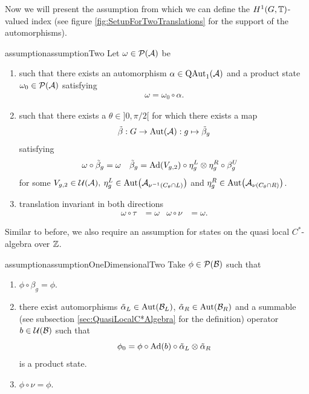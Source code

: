 \documentclass[12pt,a4paper,twoside]{article}
\numberwithin{equation}{section}
\begin{document}

Now we will present the assumption from which we can define the $H^1(G,\mathbb T)$-valued index (see figure \ref{fig:SetupForTwoTranslations} for the support of the automorphisms).
\begin{restatable}{assumption}{assumptionTwo}\label{assumption:2Translations}
	Let $\omega\in\mathcal P(\mathcal A)$ be
	\begin{enumerate}
		\item such that there exists an automorphism $\alpha\in\QAut{\AA}$ and a product state $\omega_0\in\mathcal P(\mathcal A)$ satisfying
		\begin{align}
			\omega=\omega_0\circ\alpha.
		\end{align}
		\item such that there exists a $\theta\in]0,\pi/2[$ for which there exists a map
		\begin{equation}
			\tilde\beta:G\rightarrow\Aut{\AA}:g\mapsto\tilde\beta_g
		\end{equation}
		satisfying
		\begin{align}
			\label{eq:2TranslationsCondition3part1}
			\omega\circ\tilde\beta_g&=\omega&\tilde\beta_g&=\Ad{V_{g,2}}\circ\eta^L_g\otimes\eta^R_g\circ\beta^U_g
		\end{align}
		for some $V_{g,2}\in\mathcal U(\mathcal A),$ $\eta^L_g\in\Aut{\AA_{\nu^{-1}(C_\theta\cap L)}}$ and  $\eta^R_g\in\Aut{\AA_{\nu(C_\theta\cap R)}}$.
		\item translation invariant in both directions
		\begin{align}
			\omega\circ\tau&=\omega&\omega\circ\nu&=\omega.
		\end{align}
	\end{enumerate}
\end{restatable}
Similar to before, we also require an assumption for states on the quasi local $C^*$-algebra over $\mathbb Z$.
\begin{restatable}{assumption}{assumptionOneDimensionalTwo}\label{assumption1dWithTranslation}
	Take $\phi\in\mathcal P(\mathcal B)$ such that
	\begin{enumerate}
		\item $\phi\circ\beta_g=\phi$.
		\item there exist automorphisms $\tilde\alpha_L\in\Aut{\BB_L}$, $\tilde\alpha_R\in\Aut{\BB_R}$ and a summable (see subsection \ref{sec:QuasiLocalC*Algebra} for the definition) operator $b\in\mathcal U(\mathcal B)$ such that
		\begin{equation}
			\phi_0=\phi\circ\Ad{b}\circ\tilde\alpha_L\otimes\tilde\alpha_R
		\end{equation}
		is a product state.
		\item $\phi\circ\nu=\phi$.
	\end{enumerate}
\end{restatable}
\end{document}
